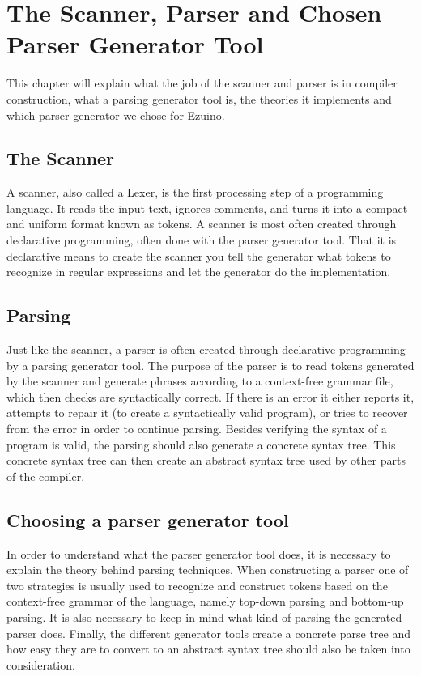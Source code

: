 \section{The Scanner, Parser and Chosen Parser Generator Tool}
This chapter will explain what the job of the scanner and parser is in compiler construction, what a parsing generator tool is, the theories it implements and which parser generator we chose for Ezuino.

\subsection{The Scanner}
A scanner, also called a Lexer, is the first processing step of a programming language. It reads the input text, ignores comments, and turns it into a compact and uniform format known as tokens.
A scanner is most often created through declarative programming, often done with the parser generator tool. That it is declarative means to create the scanner you tell the generator what tokens to recognize in regular expressions and let the generator do the implementation.

\label{parsing-subsubsection}
\subsection{Parsing}
Just like the scanner, a parser is often created through declarative programming by a parsing generator tool. The purpose of the parser is to read tokens generated by the scanner and generate phrases according to a context-free grammar file, which then checks are syntactically correct. If there is an error it either reports it, attempts to repair it (to create a syntactically valid program), or tries to recover from the error in order to continue parsing. Besides verifying the syntax of a program is valid, the parsing should also generate a concrete syntax tree. This concrete syntax tree can then create an abstract syntax tree used by other parts of the compiler.

\subsection{Choosing a parser generator tool}
In order to understand what the parser generator tool does, it is necessary to explain the theory behind parsing techniques. When constructing a parser one of two strategies is usually used to recognize and construct tokens based on the context-free grammar of the language, namely top-down parsing and bottom-up parsing. It is also necessary to keep in mind what kind of parsing the generated parser does. Finally, the different generator tools create a concrete parse tree and how easy they are to convert to an abstract syntax tree should also be taken into consideration.
